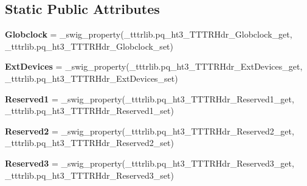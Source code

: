 \subsection*{Static Public Attributes}
\begin{DoxyCompactItemize}
\item 
\mbox{\label{classtttrlib_1_1pq__ht3___t_t_t_r_hdr_a30f297b06891acca4ea51050d92999be}} 
{\bfseries Globclock} = \+\_\+swig\+\_\+property(\+\_\+tttrlib.\+pq\+\_\+ht3\+\_\+\+T\+T\+T\+R\+Hdr\+\_\+\+Globclock\+\_\+get, \+\_\+tttrlib.\+pq\+\_\+ht3\+\_\+\+T\+T\+T\+R\+Hdr\+\_\+\+Globclock\+\_\+set)
\item 
\mbox{\label{classtttrlib_1_1pq__ht3___t_t_t_r_hdr_a0d708d3aaf65ae086991bf883566fe17}} 
{\bfseries Ext\+Devices} = \+\_\+swig\+\_\+property(\+\_\+tttrlib.\+pq\+\_\+ht3\+\_\+\+T\+T\+T\+R\+Hdr\+\_\+\+Ext\+Devices\+\_\+get, \+\_\+tttrlib.\+pq\+\_\+ht3\+\_\+\+T\+T\+T\+R\+Hdr\+\_\+\+Ext\+Devices\+\_\+set)
\item 
\mbox{\label{classtttrlib_1_1pq__ht3___t_t_t_r_hdr_a34fbe7d2d94eb90a793f4e7e34672a0c}} 
{\bfseries Reserved1} = \+\_\+swig\+\_\+property(\+\_\+tttrlib.\+pq\+\_\+ht3\+\_\+\+T\+T\+T\+R\+Hdr\+\_\+\+Reserved1\+\_\+get, \+\_\+tttrlib.\+pq\+\_\+ht3\+\_\+\+T\+T\+T\+R\+Hdr\+\_\+\+Reserved1\+\_\+set)
\item 
\mbox{\label{classtttrlib_1_1pq__ht3___t_t_t_r_hdr_ad9349929a246a90ea78bf8e1a0f454b3}} 
{\bfseries Reserved2} = \+\_\+swig\+\_\+property(\+\_\+tttrlib.\+pq\+\_\+ht3\+\_\+\+T\+T\+T\+R\+Hdr\+\_\+\+Reserved2\+\_\+get, \+\_\+tttrlib.\+pq\+\_\+ht3\+\_\+\+T\+T\+T\+R\+Hdr\+\_\+\+Reserved2\+\_\+set)
\item 
\mbox{\label{classtttrlib_1_1pq__ht3___t_t_t_r_hdr_af2432f50964c73664e5caf2219548618}} 
{\bfseries Reserved3} = \+\_\+swig\+\_\+property(\+\_\+tttrlib.\+pq\+\_\+ht3\+\_\+\+T\+T\+T\+R\+Hdr\+\_\+\+Reserved3\+\_\+get, \+\_\+tttrlib.\+pq\+\_\+ht3\+\_\+\+T\+T\+T\+R\+Hdr\+\_\+\+Reserved3\+\_\+set)
\item 
\mbox{\label{classtttrlib_1_1pq__ht3___t_t_t_r_hdr_ac31d89025f59e107066de27bf76468a5}} 

\end{DoxyCompactItemize}
